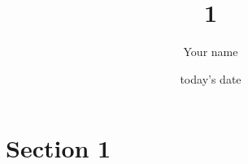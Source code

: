 \documentclass[12pt]{report}
\title{1}
\author{ Your name}
\date{today's date}
\makeatletter
\let\thetitle\@title
\makeatother
\begin{document}


%	
%            
%           
%	
%    
%    
%    
%    
%	


\tableofcontents
\pagebreak

\renewcommand{\thesection}{\arabic{section}}
\section{Section 1}
 
\end{document}
